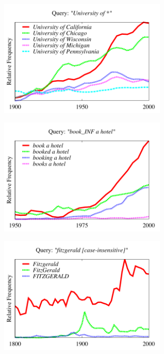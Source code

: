 \documentclass[11pt,a4paper]{article}
\begin{document}
\begin{figure}[!t]
\begin{subfigure}
  \centering
\includegraphics[width=0.9\textwidth]{graphs/university}\\
\end{subfigure}%
\begin{subfigure}
\centering
\includegraphics[width=0.9\textwidth]{graphs/book}\\
\end{subfigure}%
\begin{subfigure}
\centering
\includegraphics[width=0.9\textwidth]{graphs/fitzgerald}\\

\end{subfigure}
\end{figure}
\end{document}
